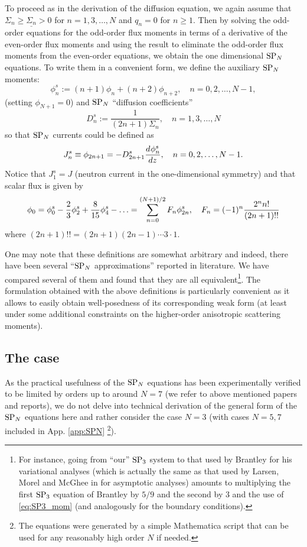 To proceed as in the derivation of the diffusion equation, we again assume that $\Sigma_n \geq \underline{\Sigma_n} > 0$
for $n = 1,3,\ldots,N$ and $q_n = 0$ for $n \geq 1$. Then by solving the
odd-order equations for the odd-order flux moments in terms of a derivative of the even-order flux moments and using the
result to eliminate the odd-order flux moments from the even-order equations, we obtain the one dimensional $\SPN$ 
equations. To write them in a convenient form, we define the auxiliary $\SPN$ moments:
\begin{equation}\label{eq:SP3_mom}
	\phi^s_n := (n+1) \phi _{n}+(n+2) \phi _{n+2},\quad n = 0,2,\ldots,N-1,
\end{equation}
(setting $\phi_{N+1} = 0$)
and $\SPN$ ``diffusion coefficients''
\begin{equation}\label{eq:SP3_dif}
	D^s_n := \frac{1}{(2 n+1) \Sigma _{n}},\quad n = 1,3,\ldots,N
\end{equation}
so that $\SPN$ currents could be defined as
$$
	J^s_n \equiv \phi_{2n+1} = -D^s_{2n+1}\der{\phi^s_n}{z}, \quad n = 0,2,\ldots,N-1.
$$
Notice that $J^s_1 = J$ (neutron current in the one-dimensional symmetry) and that scalar flux is given by
\begin{equation}\label{eq:SPN_scalar_flux}
	\phi_0 = \phi^s_0 - {\frac23}\phi^s_2 + {\frac{8}{15}}\phi^s_4 - \ldots = \suma[n]{0}{(N+1)/2}{F_{n}}\phi^s_{2n},\quad
	F_{n} = (-1)^n\frac{2^nn!}{(2n+1)\text{!!}}
\end{equation}
where
$(2n+1)!! = (2n+1)(2n-1)\cdots 3\cdot 1$.

One may note that these definitions are somewhat arbitrary and indeed, there have been several ``$\SPN$ approximations''
reported in literature. We have compared several of them and found that they are all equivalent\footnote{For instance,
going from ``our'' $\SPN[3]$ system to that used by Brantley \cite{Brantley1} for his variational analyses (which is
actually the same as that used by Larsen, Morel and McGhee in \cite{Larsen1} for asymptotic analyses) amounts to multiplying the
first $\SPN[3]$ equation of Brantley by $5/9$ and the second by $3$ and the use of \eqref{eq:SP3_mom} (and
analogously for the boundary conditions).}.
The formulation obtained with the above definitions is particularly convenient as it allows to easily obtain 
well-posedness of its corresponding weak form (at least under some additional constraints on the higher-order
anisotropic scattering moments).


\subsection{The \SPN[3] case}
As the practical usefulness of the $\SPN$ equations has been experimentally verified to be limited by orders up
to around $N = 7$ (we refer to above mentioned papers and reports), we do not delve into technical derivation of the
general form of the $\SPN$ equations here and rather consider the case $N=3$ (with cases $N = 5,7$ included in App.
\ref{app:SPN} \footnote{The equations were generated by a simple Mathematica script that can
be used for any reasonably high order $N$ if needed.}). 

